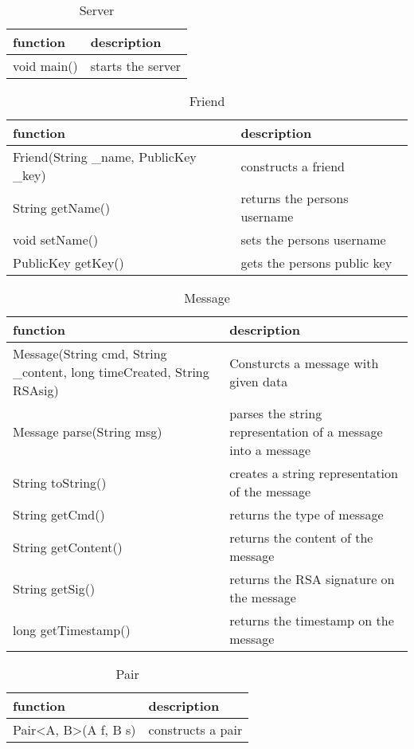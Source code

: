 \begin{table}[h]
    \centering
    \begin{tabular}{ll}
    function    & description\\ \hline
    void main() & starts the server\\
    \end{tabular}
    \caption{Server}
\end{table}

\begin{table}[h]
    \centering
    \begin{tabular}{ll}
    function                               & description\\ \hline
    Friend(String \_name, PublicKey \_key) & constructs a friend\\
    String getName()                       & returns the persons username\\
    void setName()                         & sets the persons username\\
    PublicKey getKey()                     & gets the persons public key\\
    \end{tabular}
    \caption{Friend}
\end{table}

\begin{table}[h]
    \centering
    \begin{tabular}{ll}
    function                  & description\\ \hline
    Message(String cmd, String \_content, long timeCreated, String RSAsig) & Consturcts a message with given data\\
    Message parse(String msg) & parses the string representation of a message into a message\\
    String toString()         & creates a string representation of the message\\
    String getCmd()           & returns the type of message\\
    String getContent()       & returns the content of the message\\
    String getSig()           & returns the RSA signature on the message\\
    long getTimestamp()       & returns the timestamp on the message\\
    \end{tabular}
    \caption{Message}
\end{table}

\begin{table}[h]
    \centering
    \begin{tabular}{ll}
    function         & description\\ \hline
    Pair\textless A, B\textgreater (A f, B s) & constructs a pair\\
    \end{tabular}
    \caption{Pair}
\end{table}

